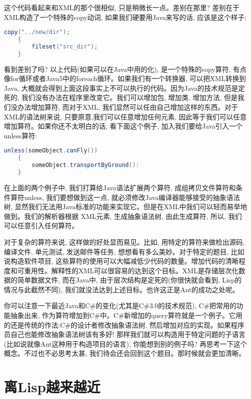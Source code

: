 \documentclass[10pt]{article}
\begin{document}
这个代码看起来和XML的那个很相似, 只是稍微长一点。差别在那里? 差别在于XML构造了一个特殊的copy动词, 如果我们硬要用Java来写的话, 应该是这个样子:
\begin{lstlisting}[language=java]
    copy("../new/dir");
    {
        fileset("src_dir");
    }
\end{lstlisting}

看到差别了吗? 以上代码(如果可以在Java中用的化), 是一个特殊的copy算符, 有点像for循环或者Java5中的foreach循环。如果我们有一个转换器, 可以把XML转换到Java, 大概就会得到上面这段事实上不可以执行的代码。因为Java的技术规范是定死的, 我们没有办法在程序里改变它。我们可以增加包, 增加类, 增加方法, 但是我们没办法增加算符, 而对于XML, 我们显然可以任由自己增加这样的东西。对于XML的语法树来说, 只要原意,我们可以任意增加任何元素, 因此等于我们可以任意增加算符。如果你还不太明白的话, 看下面这个例子, 加入我们要给Java引入一个unless算符:
\begin{lstlisting}[language=java]
    unless(someObject.canFly())
    {
        someObject.transportByGround():
    }
\end{lstlisting}

在上面的两个例子中, 我们打算给Java语法扩展两个算符, 成组拷贝文件算符和条件算符unless, 我们要想做到这一点, 就必须修改Java编译器能够接受的抽象语法树, 显然我们无法用Java标准的功能来实现它。但是在XML中我们可以轻而易举地做到。我们的解析器根据 XML元素, 生成抽象语法树, 由此生成算符, 所以, 我们可以任意引入任何算符。

对于复杂的算符来说, 这样做的好处显而易见。比如, 用特定的算符来做检出源码, 编译文件, 单元测试, 发送邮件等任务, 想想看有多么美妙。对于特定的题目, 比如说构造软件项目, 这些算符的使用可以大幅减低少代码的数量。增加代码的清晰程度和可重用性。解释性的XML可以很容易的达到这个目标。XML是存储层次化数据的简单数据文件, 而在Java中, 由于层次结构是定死的(你很快就会看到, Lisp的情况与此截然不同), 我们就没法达到上述目标。也许这正是Ant的成功之处呢。

你可以注意一下最近Java和C\#的变化(尤其是C\#3.0的技术规范), C\#把常用的功能抽象出来, 作为算符增加到C\#中。C\#新增加的query算符就是一个例子。它用的还是传统的作法:C\#的设计者修改抽象语法树, 然后增加对应的实现。如果程序员自己也能修改抽象语法树该有多好! 那样我们就可以构造用于特定问题的子语言(比如说就像Ant这种用于构造项目的语言), 你能想到别的例子吗? 再思考一下这个概念。不过也不必思考太甚, 我们待会还会回到这个题目。那时候就会更加清晰。
\section{离Lisp越来越近}
\label{sec-4}
\end{document}
